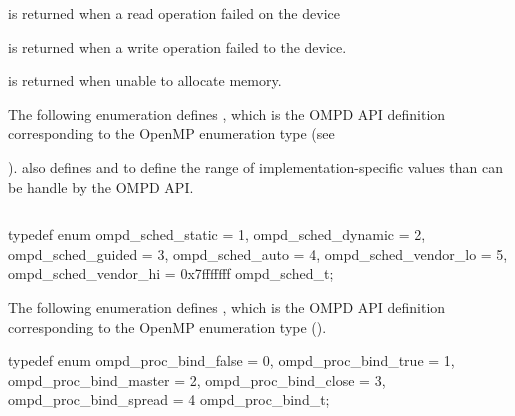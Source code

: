 \label{ompd:ompd_rc_device_read_error}
 is returned when
a read operation failed on the device

\label{ompd:ompd_rc_device_write_error}
 is returned when
a write operation failed to the device.

\label{ompd:ompd_rc_nomem}
 is returned when
unable to allocate memory.

\label{ompd:ompd_sched_t}

The following enumeration defines , which is the OMPD API definition 
corresponding to the OpenMP enumeration type  (see 

).
 also defines  and
 to define the range of implementation-specific 
 values than can be handle by the OMPD API.

\begin{quote}
	\begin{lstlisting}

	\end{lstlisting}
\end{quote}

\format

\begin{ccppspecific}
\begin{ompSyntax}
typedef enum {
  ompd_sched_static = 1,
  ompd_sched_dynamic = 2,
  ompd_sched_guided = 3,
  ompd_sched_auto = 4,
  ompd_sched_vendor_lo = 5,
  ompd_sched_vendor_hi = 0x7fffffff
} ompd_sched_t;
\end{ompSyntax}
\end{ccppspecific}


\label{ompd:ompd_proc_bind_t}

The following enumeration defines , which is the OMPD
API definition corresponding to the OpenMP enumeration type
 ().

\format

\begin{ccppspecific}
\begin{ompSyntax}
typedef enum {
  ompd_proc_bind_false = 0,
  ompd_proc_bind_true = 1,
  ompd_proc_bind_master = 2,
  ompd_proc_bind_close = 3,
  ompd_proc_bind_spread = 4
} ompd_proc_bind_t;
\end{ompSyntax}
\end{ccppspecific}


